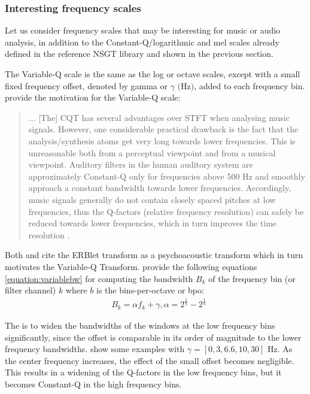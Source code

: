 \documentclass[report.tex]{subfiles}
\begin{document}
\newpagefill

\subsubsection{Interesting frequency scales}
\label{sec:fscales}

Let us consider frequency scales that may be interesting for music or audio analysis, in addition to the Constant-Q/logarithmic and mel scales already defined in the reference NSGT library and shown in the previous section.

The Variable-Q scale \parencite{variableq1, variableq2} is the same as the log or octave scales, except with a small fixed frequency offset, denoted by gamma or $\gamma \text{ (Hz)}$, added to each frequency bin. \citeauthor{variableq1} provide the motivation for the Variable-Q scale:
\begin{quote}
	... [The] CQT has several advantages over STFT when analysing music signals. However, one considerable practical drawback is the fact that the analysis/synthesis atoms get very long towards lower frequencies. This is unreasonable both from a perceptual viewpoint and from a musical viewpoint. Auditory filters in the human auditory system are approximately Constant-Q only for frequencies above 500 Hz and smoothly approach a constant bandwidth towards lower frequencies. Accordingly, music signals generally do not contain closely spaced pitches at low frequencies, thus the Q-factors (relative frequency resolution) can safely be reduced towards lower frequencies, which in turn improves the time resolution \parencite[5]{variableq1}.
\end{quote}

Both \textcite{variableq1} and \textcite{variableq2} cite the ERBlet transform \parencite{erblet} as a psychoacoustic transform which in turn motivates the Variable-Q Transform. \textcite{variableq1, variableq2} provide the following equations \eqref{equation:variablebw} for computing the bandwidth $B_{k}$ of the frequency bin (or filter channel) $k$ where $b$ is the bins-per-octave or bpo:
\begin{align}\tag{25}\label{equation:variablebw}
	\nonumber & B_{k} = \alpha f_{k} + \gamma, \alpha = 2^{\frac{1}{b}} - 2^{\frac{1}{b}}
\end{align}

The is to widen the bandwidths of the windows at the low frequency bins significantly, since the offset is comparable in its order of magnitude to the lower frequency bandwidths. \textcite{variableq1} show some examples with $\gamma = [0, 3, 6.6, 10, 30] \text{ Hz}$. As the center frequency increases, the effect of the small offset becomes negligible. This results in a widening of the Q-factors in the low frequency bins, but it becomes Constant-Q in the high frequency bins. 
\end{document}
